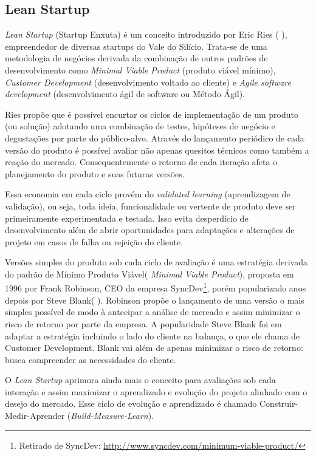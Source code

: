 \subsection{Lean Startup}
\par \emph{Lean Startup} (Startup Enxuta) é um conceito introduzido por Eric Ries ( \cite{ries:11}), empreendedor de diversas startups do Vale do Silício. Trata-se de uma metodologia de negócios derivada da combinação de outros padrões de desenvolvimento como \emph{Minimal Viable Product} (produto viável mínimo), \emph{Customer Development} (desenvolvimento voltado ao cliente) e \emph{Agile software development} (desenvolvimento ágil de software ou Método Ágil).
\par Ries propõe que é possível encurtar os ciclos de implementação de um produto (ou solução) adotando uma combinação de testes, hipóteses de negócio e degustações por parte do público-alvo. Através do lançamento periódico de cada versão do produto é possível avaliar não apenas quesitos técnicos como também a reação do mercado. Consequentemente o retorno de cada iteração afeta o planejamento do produto e suas futuras versões.
\par Essa economia em cada ciclo provém do \emph{validated learning} (aprendizagem de validação), ou seja, toda ideia, funcionalidade ou vertente de produto deve ser primeiramente experimentada e testada. Isso evita desperdício de desenvolvimento além de abrir oportunidades para adaptações e alterações de projeto em casos de falha ou rejeição do cliente.
\par Versões simples do produto sob cada ciclo de avaliação é uma estratégia derivada do padrão de Mínimo Produto Viável( \emph{Minimal Viable Product}), proposta em 1996 por Frank Robinson, CEO da empresa SyncDev\footnote{ Retirado de SyncDev: \url{http://www.syncdev.com/minimum-viable-product/}}, porém popularizado anos depois por Steve Blank( \cite{junk:2000}). Robinson propõe o lançamento de uma versão o mais simples possível de modo à antecipar a análise de mercado e assim minimizar o risco de retorno por parte da empresa. A popularidade Steve Blank foi em adaptar a estratégia incluindo o lado do cliente na balança, o que ele chama de Customer Development. Blank vai além de apenas minimizar o risco de retorno: busca compreender as necessidades do cliente.
\par O \emph{Lean Startup} aprimora ainda mais o conceito para avaliações sob cada interação e assim maximizar o aprendizado e evolução do projeto alinhado com o desejo do mercado. Esse ciclo de evolução e aprendizado é  chamado Construir-Medir-Aprender (\emph{Build-Measure-Learn}).


